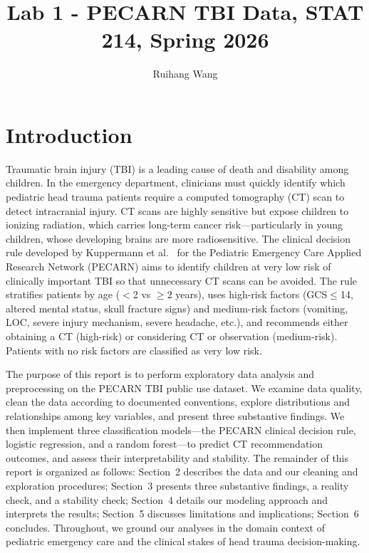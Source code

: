 \documentclass[10pt,letterpaper]{article}
\title{Lab 1 - PECARN TBI Data, STAT 214, Spring 2026}
\author{Ruihang Wang}
\begin{document}
\maketitle



\section{Introduction}\label{introduction}

Traumatic brain injury (TBI) is a leading cause of death and disability among children. In the emergency department, clinicians must quickly identify which pediatric head trauma patients require a computed tomography (CT) scan to detect intracranial injury. CT scans are highly sensitive but expose children to ionizing radiation, which carries long-term cancer risk---particularly in young children, whose developing brains are more radiosensitive. The clinical decision rule developed by Kuppermann et al.\ \cite{kuppermann2009} for the Pediatric Emergency Care Applied Research Network (PECARN) aims to identify children at very low risk of clinically important TBI so that unnecessary CT scans can be avoided. The rule stratifies patients by age ($<$2 vs $\ge$2 years), uses high-risk factors (GCS$\le$14, altered mental status, skull fracture signs) and medium-risk factors (vomiting, LOC, severe injury mechanism, severe headache, etc.), and recommends either obtaining a CT (high-risk) or considering CT or observation (medium-risk). Patients with no risk factors are classified as very low risk.

The purpose of this report is to perform exploratory data analysis and preprocessing on the PECARN TBI public use dataset. We examine data quality, clean the data according to documented conventions, explore distributions and relationships among key variables, and present three substantive findings. We then implement three classification models---the PECARN clinical decision rule, logistic regression, and a random forest---to predict CT recommendation outcomes, and assess their interpretability and stability. The remainder of this report is organized as follows: Section~2 describes the data and our cleaning and exploration procedures; Section~3 presents three substantive findings, a reality check, and a stability check; Section~4 details our modeling approach and interprets the results; Section~5 discusses limitations and implications; Section~6 concludes. Throughout, we ground our analyses in the domain context of pediatric emergency care and the clinical stakes of head trauma decision-making.
\end{document}
